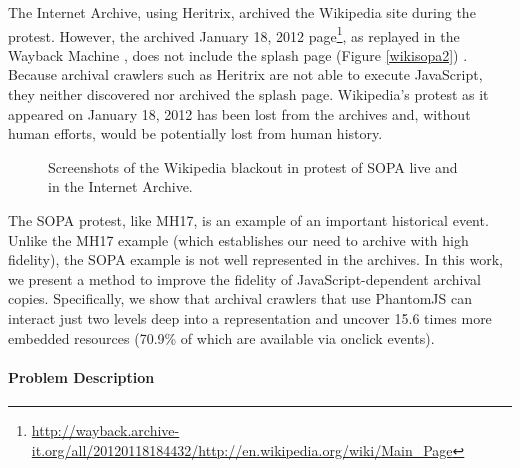 \documentclass{sig-alternate}
\begin{document}
The Internet Archive, using Heritrix, archived the Wikipedia site during the protest. However, the archived January 18, 2012 page\footnote{\url{http://wayback.archive-it.org/all/20120118184432/http://en.wikipedia.org/wiki/Main_Page}}, as replayed in the Wayback Machine \cite{waybackarchives2}, does not include the splash page (Figure \ref{wikisopa2}) \cite{brunelleSopa}. Because archival crawlers such as Heritrix are not able to execute JavaScript, they neither discovered nor archived the splash page. Wikipedia's protest as it appeared on January 18, 2012 has been lost from the archives and, without human efforts, would be potentially lost from human history. 


\begin{figure*}
  \begin{center}
    \qquad
  \end{center}
  \caption{Screenshots of the Wikipedia blackout in protest of SOPA live and in the Internet Archive.}
  \label{liveWiki}
\end{figure*}

The SOPA protest, like MH17, is an example of an important historical event. Unlike the MH17 example (which establishes our need to archive with high fidelity), the SOPA example is not well represented in the archives. In this work, we present a method to improve the fidelity of JavaScript-dependent archival copies. %
Specifically, we show that archival crawlers that use PhantomJS can interact just two levels deep into a representation and uncover 15.6 times more embedded resources (70.9\% of which are available via onclick events).

\paragraph{Problem Description}
\label{problem}
\end{document}
